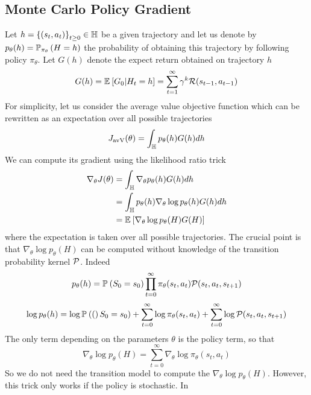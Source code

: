 \subsection{Monte Carlo Policy Gradient}
Let $h = {\{(s_t, a_t)\}}_{t\geq 0} \in \H$ be a given trajectory and let us 
denote by $p_\theta(h) = \P[\pi_\theta]{H = h}$ the probability of obtaining 
this trajectory by following policy $\pi_\theta$. Let $G(h)$ denote the expect
return obtained on trajectory $h$
\begin{equation}
	G(h) = \E{G_0 | H_t = h} = \sum_{t=1}^\infty \gamma^k \calR(s_{t-1},
	a_{t-1}) 
\end{equation}
For simplicity, let us consider the average value objective function which can
be rewritten as an expectation over all possible trajectories
\begin{equation}
	J_{\text{avV}}(\theta) = \int_\H p_\theta(h) G(h) dh
\end{equation}
We can compute its gradient using the likelihood ratio trick 
\begin{equation}
	\begin{split}
		\nabla_\theta J(\theta) &= \int_\H \nabla_\theta p_\theta(h) G(h) dh\\
								&= \int_\H p_\theta(h)\nabla_\theta \log
									p_\theta(h)G(h)dh\\
								&= \E{\nabla_\theta \log p_\theta(H)G(H)}
	\end{split}
\end{equation}
where the expectation is taken over all possible trajectories. The crucial
point is that $\nabla_\theta \log p_\theta(H)$ can be computed without
knowledge of the transition probability kernel $\calP$. Indeed
\begin{equation*}
	p_\theta(h) = \P{S_0 = s_0} \prod_{t=0}^\infty \pi_\theta(s_t, a_t)
	\calP(s_t, a_t, s_{t+1})
\end{equation*}
\begin{equation*}
	\log p_\theta(h) = \log \P(S_0 = s_0) + \sum_{t=0}^\infty \log 
	\pi_\theta(s_t, a_t) + \sum_{t=0}^\infty \log \calP(s_t, a_t, s_{t+1})
\end{equation*}
The only term depending on the parameters $\theta$ is the policy term, so that
\begin{equation}
	\nabla_\theta \log p_\theta(H) = \sum_{t=0}^\infty \nabla_\theta \log 
	\pi_\theta(s_t, a_t)
\end{equation}
So we do not need the transition model to compute the $\nabla_\theta \log 
p_\theta(H)$. However, this trick only works if the policy is stochastic. In
